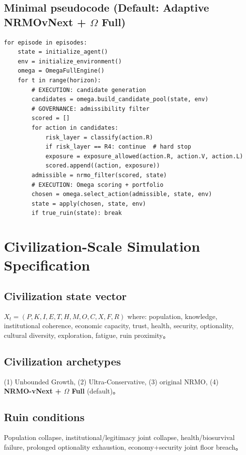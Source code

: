 \documentclass[11pt,a4paper]{article}
\theoremstyle{definition}\newtheorem{definition}{Definition}[section]
\begin{document}
\subsection{Minimal pseudocode (Default: Adaptive NRMOvNext + $\Omega$ Full)}
\begin{lstlisting}
for episode in episodes:
    state = initialize_agent()
    env = initialize_environment()
    omega = OmegaFullEngine()
    for t in range(horizon):
        # EXECUTION: candidate generation
        candidates = omega.build_candidate_pool(state, env)
        # GOVERNANCE: admissibility filter
        scored = []
        for action in candidates:
            risk_layer = classify(action.R)
            if risk_layer == R4: continue  # hard stop
            exposure = exposure_allowed(action.R, action.V, action.L)
            scored.append((action, exposure))
        admissible = nrmo_filter(scored, state)
        # EXECUTION: Omega scoring + portfolio
        chosen = omega.select_action(admissible, state, env)
        state = apply(chosen, state, env)
        if true_ruin(state): break
\end{lstlisting}


\section{Civilization-Scale Simulation Specification}

\subsection{Civilization state vector}
$X_t = (P, K, I, E, T, H, M, O, C, X, F, R)$ where: population, knowledge, institutional coherence, economic capacity, trust, health, security, optionality, cultural diversity, exploration, fatigue, ruin proximity。

\subsection{Civilization archetypes}
(1) Unbounded Growth, (2) Ultra-Conservative, (3) original NRMO, (4) \textbf{NRMO-vNext + $\Omega$ Full} (default)。

\subsection{Ruin conditions}
Population collapse, institutional/legitimacy joint collapse, health/biosurvival failure, prolonged optionality exhaustion, economy+security joint floor breach。
\end{document}
